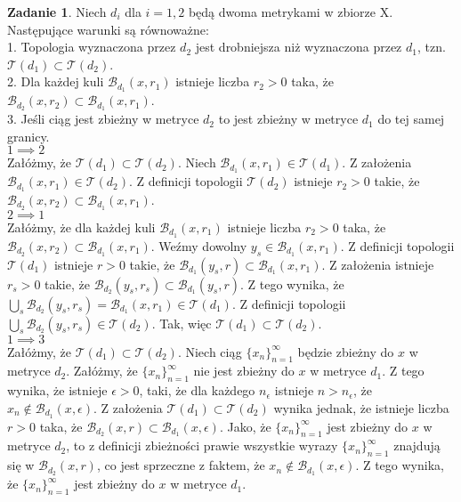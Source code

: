 \documentclass{article}
\theoremstyle{plain}%
\theoremstyle{definition}
\newtheorem{zad}{Zadanie}
\begin{document}
	\begin{zad}
		Niech $d_i$ dla $i = 1,2$ będą dwoma metrykami w zbiorze X. Następujące warunki są równoważne:\\
		1. Topologia wyznaczona przez $d_2$ jest drobniejsza niż wyznaczona przez $d_1$, tzn. $\mathcal{T}(d_1)\subset\mathcal{T}(d_2)$.\\
		2. Dla każdej kuli $\mathcal{B}_{d_1}(x,r_1)$ istnieje liczba $r_2>0$ taka, że $\mathcal{B}_{d_2}(x,r_2)\subset\mathcal{B}_{d_1}(x,r_1)$.\\
		3. Jeśli ciąg jest zbieżny w metryce $d_2$ to jest zbieżny w metryce $d_1$ do tej samej granicy.\\
		$1\implies2$\\
		Załóżmy, że $\mathcal{T}(d_1)\subset\mathcal{T}(d_2)$. Niech $\mathcal{B}_{d_1}(x,r_1)\in\mathcal{T}(d_1)$. Z założenia $\mathcal{B}_{d_1}(x,r_1)\in\mathcal{T}(d_2)$. Z definicji topologii $\mathcal{T}(d_2)$ istnieje $r_2>0$ takie, że\\
		$\mathcal{B}_{d_2}(x,r_2)\subset\mathcal{B}_{d_1}(x,r_1)$.\\
		$2\implies1$\\
		Załóżmy, że  dla każdej kuli $\mathcal{B}_{d_1}(x,r_1)$ istnieje liczba $r_2>0$ taka, że\\ $\mathcal{B}_{d_2}(x,r_2)\subset\mathcal{B}_{d_1}(x,r_1)$. Weźmy dowolny $y_s\in\mathcal{B}_{d_1}(x,r_1)$. Z definicji topologii $\mathcal{T}(d_1)$ istnieje $r>0$ takie, że $\mathcal{B}_{d_1}(y_s,r)\subset\mathcal{B}_{d_1}(x,r_1)$. Z założenia istnieje $r_s>0$ takie, że $\mathcal{B}_{d_2}(y_s,r_s)\subset\mathcal{B}_{d_1}(y_s,r)$. Z tego wynika, że $\bigcup_s \mathcal{B}_{d_2}(y_s,r_s) = \mathcal{B}_{d_1}(x,r_1)\in\mathcal{T}(d_1)$. Z definicji topologii $\bigcup_s \mathcal{B}_{d_2}(y_s,r_s)\in\mathcal{T}(d_2)$. Tak, więc $\mathcal{T}(d_1)\subset\mathcal{T}(d_2)$.\\
		$1\implies3$\\
		Załóżmy, że $\mathcal{T}(d_1)\subset\mathcal{T}(d_2)$. Niech ciąg $\{x_n\}_{n=1}^\infty$ będzie zbieżny do $x$ w metryce $d_2$. Załóżmy, że $\{x_n\}_{n=1}^\infty$ nie jest zbieżny do $x$ w metryce $d_1$. Z tego wynika, że istnieje $\epsilon>0$, taki, że dla każdego $n_{\epsilon}$ istnieje $n>n_{\epsilon}$, że $x_n\not\in\mathcal{B}_{d_1}(x,\epsilon)$. Z założenia $\mathcal{T}(d_1)\subset\mathcal{T}(d_2)$ wynika jednak, że istnieje liczba $r>0$ taka, że $\mathcal{B}_{d_2}(x,r)\subset\mathcal{B}_{d_1}(x,\epsilon)$. Jako, że $\{x_n\}_{n=1}^\infty$ jest zbieżny do $x$ w metryce $d_2$, to z definicji zbieżności prawie wszystkie wyrazy $\{x_n\}_{n=1}^\infty$ znajdują się w $\mathcal{B}_{d_2}(x,r)$, co jest sprzeczne z faktem, że $x_n\not\in\mathcal{B}_{d_1}(x,\epsilon)$. Z tego wynika, że $\{x_n\}_{n=1}^\infty$ jest zbieżny do $x$ w metryce $d_1$.\\

\end{zad}
\end{document}
